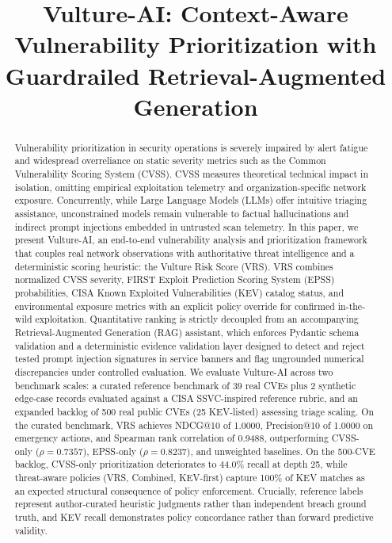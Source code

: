\documentclass[conference]{IEEEtran}
\begin{document}
\title{Vulture-AI: Context-Aware Vulnerability Prioritization with Guardrailed Retrieval-Augmented Generation}

\author{
}

\maketitle

\begin{abstract}
Vulnerability prioritization in security operations is severely impaired by alert fatigue and widespread overreliance on static severity metrics such as the Common Vulnerability Scoring System (CVSS). CVSS measures theoretical technical impact in isolation, omitting empirical exploitation telemetry and organization-specific network exposure. Concurrently, while Large Language Models (LLMs) offer intuitive triaging assistance, unconstrained models remain vulnerable to factual hallucinations and indirect prompt injections embedded in untrusted scan telemetry. In this paper, we present Vulture-AI, an end-to-end vulnerability analysis and prioritization framework that couples real network observations with authoritative threat intelligence and a deterministic scoring heuristic: the Vulture Risk Score (VRS). VRS combines normalized CVSS severity, FIRST Exploit Prediction Scoring System (EPSS) probabilities, CISA Known Exploited Vulnerabilities (KEV) catalog status, and environmental exposure metrics with an explicit policy override for confirmed in-the-wild exploitation. Quantitative ranking is strictly decoupled from an accompanying Retrieval-Augmented Generation (RAG) assistant, which enforces Pydantic schema validation and a deterministic evidence validation layer designed to detect and reject tested prompt injection signatures in service banners and flag ungrounded numerical discrepancies under controlled evaluation. We evaluate Vulture-AI across two benchmark scales: a curated reference benchmark of 39 real CVEs plus 2 synthetic edge-case records evaluated against a CISA SSVC-inspired reference rubric, and an expanded backlog of 500 real public CVEs (25 KEV-listed) assessing triage scaling. On the curated benchmark, VRS achieves NDCG@10 of 1.0000, Precision@10 of 1.0000 on emergency actions, and Spearman rank correlation of 0.9488, outperforming CVSS-only ($\rho = 0.7357$), EPSS-only ($\rho = 0.8237$), and unweighted baselines. On the 500-CVE backlog, CVSS-only prioritization deteriorates to 44.0\% recall at depth 25, while threat-aware policies (VRS, Combined, KEV-first) capture 100\% of KEV matches as an expected structural consequence of policy enforcement. Crucially, reference labels represent author-curated heuristic judgments rather than independent breach ground truth, and KEV recall demonstrates policy concordance rather than forward predictive validity.
\end{abstract}
\end{document}

